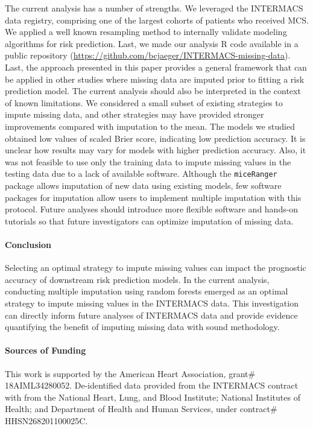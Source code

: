 \documentclass{article}
\begin{document}
The current analysis has a number of strengths. We leveraged the
INTERMACS data registry, comprising one of the largest cohorts of
patients who received MCS. We applied a well known resampling method to
internally validate modeling algorithms for risk prediction. Last, we
made our analysis R code available in a public repository
(\url{https://github.com/bcjaeger/INTERMACS-missing-data}). Last, the
approach presented in this paper provides a general framework that can
be applied in other studies where missing data are imputed prior to
fitting a risk prediction model. The current analysis should also be
interpreted in the context of known limitations. We considered a small
subset of existing strategies to impute missing data, and other
strategies may have provided stronger improvements compared with
imputation to the mean. The models we studied obtained low values of
scaled Brier score, indicating low prediction accuracy. It is unclear
how results may vary for models with higher prediction accuracy. Also,
it was not feasible to use only the training data to impute missing
values in the testing data due to a lack of available software. Although
the \texttt{miceRanger} package allows imputation of new data using
existing models, few software packages for imputation allow users to
implement multiple imputation with this protocol. Future analyses should
introduce more flexible software and hands-on tutorials so that future
investigators can optimize imputation of missing data.

\paragraph{Conclusion}

Selecting an optimal strategy to impute missing values can impact the
prognostic accuracy of downstream risk prediction models. In the current
analysis, conducting multiple imputation using random forests emerged as
an optimal strategy to impute missing values in the INTERMACS data. This
investigation can directly inform future analyses of INTERMACS data and
provide evidence quantifying the benefit of imputing missing data with
sound methodology.

\paragraph{Sources of Funding}

This work is supported by the American Heart Association, grant\#
18AIML34280052. De-identified data provided from the INTERMACS contract
with from the National Heart, Lung, and Blood Institute; National
Institutes of Health; and Department of Health and Human Services, under
contract\# HHSN268201100025C.
\end{document}
